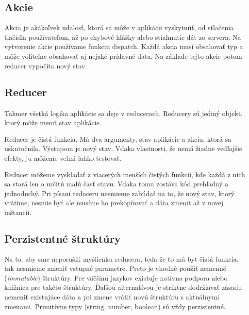 \subsection{Akcie}
Akcia je akákoľvek udalosť, ktorá sa môže v aplikácii vyskytnúť, od stlačenia tlačidla používateľom, až po chybové hlášky alebo stiahnutie dát zo servera. Na vytvorenie akcie používame funkciu dispatch. Každá akcia musí obsahovať typ a môže voliteľne obsahovať aj nejaké prídavné data. Na základe tejto akcie potom reducer vypočíta nový stav.

\subsection{Reducer}
\NEW{}
\emph{} \cite{reduxReducer}

\paragraph{}
Takmer všetká logika aplikácie sa deje v reduceroch. Reducery sú jediný objekt, ktorý môže meniť stav aplikácie.

Reducer je čistá funkcia. Má dva argumenty, stav aplikácie a akciu, ktorá sa uskutočnila. Výstupom je nový stav. Vďaka vlastnosti, že nemá žiadne vedľajšie efekty, ju môžeme veľmi ľahko testovať.

Reducer môžeme vyskladať z viacerých menších čistých funkcií, kde každá z nich sa stará len o určitú malú časť stavu. Vďaka tomu zostáva kód prehľadný a jednoduchý. 
Pri písaní reduceru nesmieme zabúdať na to, že nový stav, ktorý vrátime, nesmie byť  ale musíme ho prekopírovať a dáta zmeniť až v novej inštancii.

\subsection{Perzistentné štruktúry}
Na to, aby sme neporušili myšlienku reducera, teda že to má byť čistá funkcia, tak nesmieme zmeniť vstupné parametre. Preto je vhodné použiť nemenné (\emph{immutable}) štruktúry. Pre väčšínu jazykov existuje natívna podpora alebo knižnica pre takéto štruktúry. Ďalšou alternatívou je striktne dodržiavať zásadu nemeniť existujúce dáta a pri zmene vrátiť novú štruktúru s aktuálnymi zmenami. \NEW{}Primitívne typy (string, number, boolean) sú vždy perzistentné.

